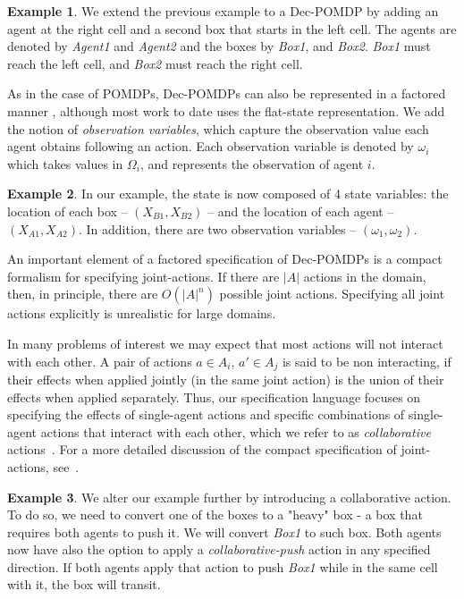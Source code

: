 \documentclass[letterpaper]{article} %
\theoremstyle{definition}
\newtheorem{example}{Example}
\begin{document}
\begin{example}
We extend the previous example 
to a Dec-POMDP by adding an agent at the right cell and a second box that starts in the left cell. The agents are denoted by \emph{Agent1} and \emph{Agent2} and the boxes by \emph{Box1}, and \emph{Box2}. \emph{Box1} must reach the left cell, and \emph{Box2} must reach the right cell.
\end{example}

As in the case of POMDPs, Dec-POMDPs can also be represented in a factored manner \cite{FDECPOMDP}, although most work to date uses the flat-state representation.
We add the notion of \emph{observation variables}, which capture the observation value each agent obtains following an action. Each observation variable is denoted by $\omega_i$ which takes values in $\Omega_i$, and represents the observation of agent $i$.

\begin{example}
In our example, the state is now composed of 4 state variables: the location of each box -- $(X_{B1}, X_{B2})$ -- and the location of each agent -- $(X_{A1}, X_{A2})$. In addition, there are two observation variables -- $(\omega_1, \omega_2)$.
\end{example}

An important element of a factored specification of Dec-POMDPs is a compact formalism for specifying joint-actions. If there are $|A|$ actions in the domain, then, in principle, there are $O(|A|^n)$ possible joint actions. Specifying all joint actions explicitly is unrealistic for large domains. 

In many problems of interest we may expect
that most actions will not interact with each other. A pair of actions $a\in A_i$, $a' \in A_j$ is said to be non interacting, if their effects when applied jointly (in the same joint action) is the union of their effects when applied separately.
Thus, our specification language focuses on specifying
the effects of single-agent actions and specific
combinations of single-agent actions that interact with each other, which we refer to as {\em collaborative} actions~\cite{CPOR}.
For a more detailed discussion of the compact specification of joint-actions, see~\cite{INTERPRIVATE}. 

\begin{example}
We alter our example further by introducing a collaborative action. To do so, we need to convert one of the boxes to a "heavy" box - a box that requires both agents to push it. We will convert \emph{Box1} to such box. Both agents now have also the option to apply a \emph{collaborative-push} action in any specified direction. If both agents apply that action to push \emph{Box1} while in the same cell with it, the box will transit.
\end{example}
\end{document}
